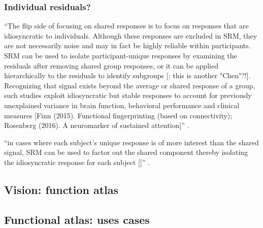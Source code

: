 \subsubsection{Individual residuals?}



%
``The flip side of focusing on shared responses is to focus on responses that
are idiosyncratic to individuals.
%
Although these responses are excluded in SRM, they are not necessarily noise and
may in fact be highly reliable within participants.
%
SRM can be used to isolate participant-unique responses by examining the
residuals after removing shared group responses, or it can be applied
hierarchically to the residuals to identify subgroups [\citet{chen2017shared};
this is another "Chen"?!].
%
Recognizing that signal exists beyond the average or shared response of a group,
such studies exploit idiosyncratic but stable responses to account for
previously unexplained variance in brain function, behavioral performance and
clinical measures [Finn (2015). Functional fingerprinting (based on
connectivity); Rosenberg (2016). A neuromarker of sustained attention]''
\citep{cohen2017computational}.

%
``in cases where each subject's unique response is of more interest
than the shared signal, SRM can be used to factor out the shared component
thereby isolating the idiosyncratic response for each subject
[\citep{chen2015reduced}]'' \citep{kumar2020brainiak}.


\subsection{Vision: function atlas}






\subsection{Functional atlas: uses cases}

